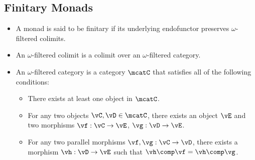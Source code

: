 \subsection{Finitary Monads}

\begin{itemize}
    \item A monad is said to be finitary if its underlying endofunctor preserves $\omega$-filtered colimits.
    \item An $\omega$-filtered colimit is a colimit over an $\omega$-filtered category.
    \item An $\omega$-filtered category is a category $\mcatC$ that satisfies all of the following conditions: 
        \begin{itemize}
            \item There exists at least one object in $\mcatC$.
            \item For any two objects $\vC, \vD \in \mcatC$, there exists an object $\vE$ and two morphisms $\vf : \vC \to \vE$, $\vg : \vD \to \vE$.
            \item For any two parallel morphisms $\vf,\vg : \vC \to \vD$, there exists a morphism $\vh : \vD \to \vE$ such that $\vh \comp \vf = \vh \comp \vg$.
        \end{itemize}
\end{itemize}

